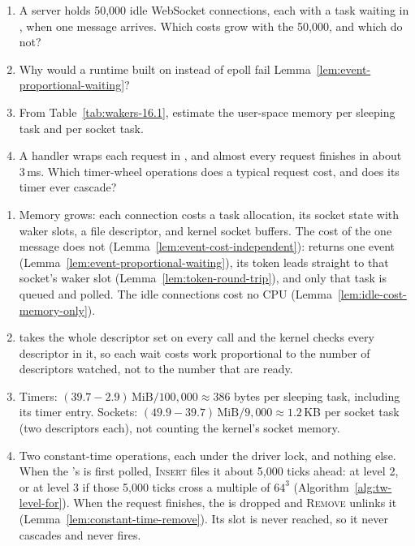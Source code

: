 \begin{Exercise}[title={Why it scales}]
    \begin{enumerate}
        \item A server holds 50,000 idle WebSocket connections, each with a task waiting in , when one message arrives. Which costs grow with the 50,000, and which do not?
        \item Why would a runtime built on  instead of epoll fail Lemma~\ref{lem:event-proportional-waiting}?
        \item From Table~\ref{tab:wakers-16.1}, estimate the user-space memory per sleeping task and per socket task.
        \item A handler wraps each request in , and almost every request finishes in about 3\,ms. Which timer-wheel operations does a typical request cost, and does its timer ever cascade?
    \end{enumerate}
\end{Exercise}
\begin{Answer}
    \begin{enumerate}
        \item Memory grows: each connection costs a task allocation, its socket state with waker slots, a file descriptor, and kernel socket buffers. The cost of the one message does not (Lemma~\ref{lem:event-cost-independent}):  returns one event (Lemma~\ref{lem:event-proportional-waiting}), its token leads straight to that socket's waker slot (Lemma~\ref{lem:token-round-trip}), and only that task is queued and polled. The idle connections cost no CPU (Lemma~\ref{lem:idle-cost-memory-only}).
        \item {} takes the whole descriptor set on every call and the kernel checks every descriptor in it, so each wait costs work proportional to the number of descriptors watched, not to the number that are ready.
        \item Timers: $(39.7 - 2.9)\,\text{MiB} / 100{,}000 \approx 386$ bytes per sleeping task, including its timer entry. Sockets: $(49.9 - 39.7)\,\text{MiB} / 9{,}000 \approx 1.2$\,KB per socket task (two descriptors each), not counting the kernel's socket memory.
        \item Two constant-time operations, each under the driver lock, and nothing else. When the 's  is first polled, \textsc{Insert} files it about 5,000 ticks ahead: at level 2, or at level 3 if those 5,000 ticks cross a multiple of $64^3$ (Algorithm~\ref{alg:tw-level-for}). When the request finishes, the  is dropped and \textsc{Remove} unlinks it (Lemma~\ref{lem:constant-time-remove}). Its slot is never reached, so it never cascades and never fires.
    \end{enumerate}
\end{Answer}
